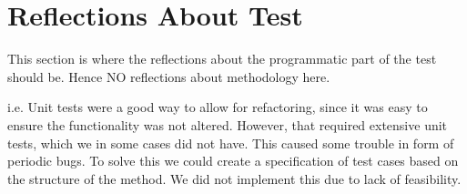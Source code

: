 \section{Reflections About Test}
This section is where the reflections about the programmatic part of the test should be. Hence NO reflections about methodology here.

i.e. Unit tests were a good way to allow for refactoring, since it was easy to ensure the functionality was not altered. However, that required extensive unit tests, which we in some cases did not have. This caused some trouble in form of periodic bugs. To solve this we could create a specification of test cases based on the structure of the method. We did not implement this due to lack of feasibility.